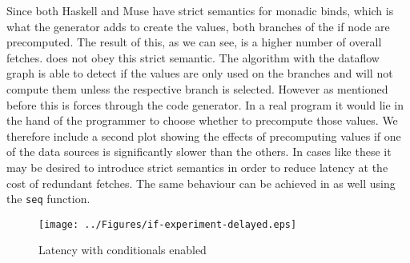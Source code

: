 Since both Haskell and Muse have strict semantics for monadic binds, which is what the generator adds to create the values, both branches of the if node are precomputed.
The result of this, as we can see, is a higher number of overall fetches.
\yauhau{} does not obey this strict semantic. The algorithm with the dataflow graph is able to detect if the values are only used on the branches and will not compute them unless the respective branch is selected.
However as mentioned before this is forces through the code generator.
In a real program it would lie in the hand of the programmer to choose whether to precompute those values.
We therefore include a second plot showing the effects of precomputing values if one of the data sources is significantly slower than the others.
In cases like these it may be desired to introduce strict semantics in order to reduce latency at the cost of redundant fetches.
The same behaviour can be achieved in \yauhau{} as well using the \texttt{seq} function.

\begin{figure}
    \texttt{[image: ../Figures/if-experiment-delayed.eps]}
    \caption{Latency with conditionals enabled}
\end{figure}

